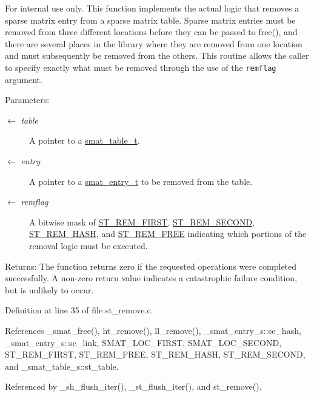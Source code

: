 \begin{Desc}
\item[For internal use only.]
This function implements the actual logic that removes a sparse matrix entry from a sparse matrix table. Sparse matrix entries must be removed from three different locations before they can be passed to free(), and there are several places in the library where they are removed from one location and must subsequently be removed from the others. This routine allows the caller to specify exactly what must be removed through the use of the {\tt remflag} argument.

\begin{Desc}
\item[Parameters:]
\begin{description}
\item[\mbox{$\leftarrow$} {\em table}]A pointer to a \hyperlink{group__dbprim__smat_ga0}{smat\_\-table\_\-t}. \item[\mbox{$\leftarrow$} {\em entry}]A pointer to a \hyperlink{group__dbprim__smat_ga2}{smat\_\-entry\_\-t} to be removed from the table. \item[\mbox{$\leftarrow$} {\em remflag}]A bitwise mask of \hyperlink{group__dbprim__smat_ga66}{ST\_\-REM\_\-FIRST}, \hyperlink{group__dbprim__smat_ga67}{ST\_\-REM\_\-SECOND}, \hyperlink{group__dbprim__smat_ga68}{ST\_\-REM\_\-HASH}, and \hyperlink{group__dbprim__smat_ga69}{ST\_\-REM\_\-FREE} indicating which portions of the removal logic must be executed.\end{description}
\end{Desc}
\begin{Desc}
\item[Returns:]The function returns zero if the requested operations were completed successfully. A non-zero return value indicates a catastrophic failure condition, but is unlikely to occur.\end{Desc}
\end{Desc}


Definition at line 35 of file st\_\-remove.c.

References \_\-smat\_\-free(), ht\_\-remove(), ll\_\-remove(), \_\-smat\_\-entry\_\-s::se\_\-hash, \_\-smat\_\-entry\_\-s::se\_\-link, SMAT\_\-LOC\_\-FIRST, SMAT\_\-LOC\_\-SECOND, ST\_\-REM\_\-FIRST, ST\_\-REM\_\-FREE, ST\_\-REM\_\-HASH, ST\_\-REM\_\-SECOND, and \_\-smat\_\-table\_\-s::st\_\-table.

Referenced by \_\-sh\_\-flush\_\-iter(), \_\-st\_\-flush\_\-iter(), and st\_\-remove().

